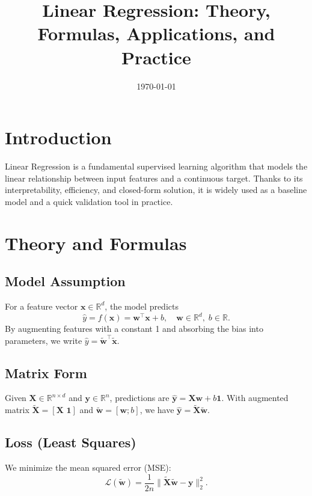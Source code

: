 \documentclass{article}
\title{Linear Regression: Theory, Formulas, Applications, and Practice}
\author{}
\date{\today}
\begin{document}
\maketitle

\section{Introduction}
Linear Regression is a fundamental supervised learning algorithm that models the linear relationship between input features and a continuous target. Thanks to its interpretability, efficiency, and closed-form solution, it is widely used as a baseline model and a quick validation tool in practice.

\section{Theory and Formulas}
\subsection{Model Assumption}
For a feature vector \(\mathbf{x} \in \mathbb{R}^d\), the model predicts
\begin{equation}
    \hat{y} = f(\mathbf{x}) = \mathbf{w}^\top \mathbf{x} + b,\quad \mathbf{w} \in \mathbb{R}^d,\; b \in \mathbb{R}.
\end{equation}
By augmenting features with a constant 1 and absorbing the bias into parameters, we write \(\hat{y} = \tilde{\mathbf{w}}^\top \tilde{\mathbf{x}}\).

\subsection{Matrix Form}
Given \(\mathbf{X}\in\mathbb{R}^{n\times d}\) and \(\mathbf{y}\in\mathbb{R}^{n}\), predictions are \(\hat{\mathbf{y}}=\mathbf{X}\mathbf{w}+b\mathbf{1}\). With augmented matrix \(\tilde{\mathbf{X}}=[\mathbf{X}\,\,\mathbf{1}]\) and \(\tilde{\mathbf{w}}=[\mathbf{w};b]\), we have \(\hat{\mathbf{y}}=\tilde{\mathbf{X}}\tilde{\mathbf{w}}\).

\subsection{Loss (Least Squares)}
We minimize the mean squared error (MSE):
\begin{equation}
    \mathcal{L}(\tilde{\mathbf{w}}) = \frac{1}{2n} \lVert \tilde{\mathbf{X}}\tilde{\mathbf{w}} - \mathbf{y} \rVert_2^2.
\end{equation}
\end{document}
